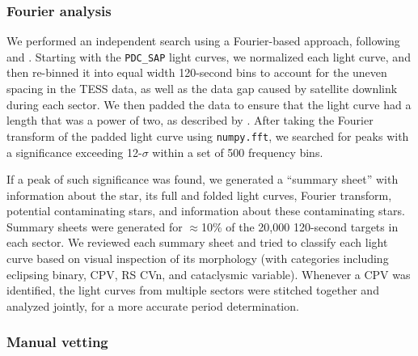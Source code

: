 \documentclass[11pt,twocolumn,tighten]{aastex63}
\begin{document}
\subsubsection{Fourier analysis}
\label{subsec:fourier}

We performed an independent search using a Fourier-based approach,
following \citet{2019ApJ...876..127Z} and \citet[][their
Section~1.3]{2023MNRAS.524.4220P}.  Starting with the {\tt PDC\_SAP}
light curves, we normalized each light curve, and then re-binned it
into equal width 120-second bins to account for the uneven spacing in
the TESS data, as well as the data gap caused by satellite downlink
during each sector.  We then padded the data to ensure that the light
curve had a length that was a power of two, as described by
\citeauthor{2019ApJ...876..127Z}.  After taking the Fourier transform
of the padded light curve using {\tt numpy.fft}, we searched for peaks
with a significance exceeding 12-$\sigma$ within a set of 500
frequency bins.

If a peak of such significance was found, we generated a ``summary
sheet'' with information about the star, its full and folded light
curves, Fourier transform, potential contaminating stars, and
information about these contaminating stars.  Summary sheets were
generated for $\approx$10\% of the 20{,}000 120-second targets in each
sector.  We reviewed each summary sheet and tried to classify each
light curve based on visual inspection of its morphology (with
categories including eclipsing binary, CPV, RS CVn, and cataclysmic
variable). Whenever a CPV was identified, the light curves from
multiple sectors were stitched together and analyzed jointly, for a
more accurate period determination.



\subsubsection{Manual vetting}
\label{subsec:visual}
\end{document}
